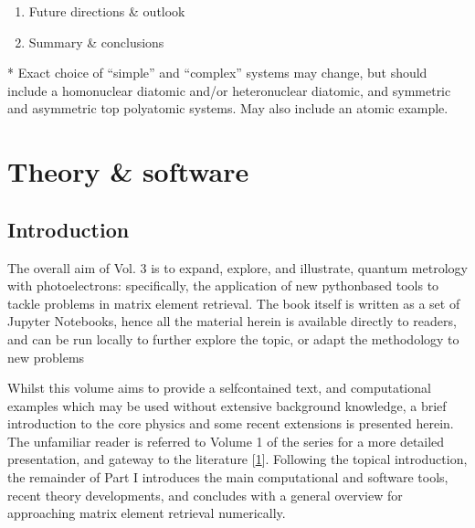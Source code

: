 \documentclass[letterpaper,10pt,english]{jupyterBook}
\begin{document}
\begin{enumerate}
\sphinxAtStartPar
c.  Direct molecular frame reconstruction via matrix\sphinxhyphen{}inversion
methods.

\sphinxAtStartPar
d.  Comparison of methods.

\sphinxAtStartPar
e.  Information content/quantum information analysis.

\item {} 
\sphinxAtStartPar
Future directions \& outlook

\item {} 
\sphinxAtStartPar
Summary \& conclusions

\end{enumerate}

\sphinxAtStartPar
* Exact choice of “simple” and “complex” systems may change, but should
include a homonuclear diatomic and/or heteronuclear diatomic, and
symmetric and asymmetric top polyatomic systems. May also include an
atomic example.

\sphinxstepscope


\part{Theory \& software}

\sphinxstepscope


\chapter{Introduction}
\label{\detokenize{part1/main_intro_051122:introduction}}\label{\detokenize{part1/main_intro_051122::doc}}
\sphinxAtStartPar
The overall aim of Vol. 3 is to expand, explore, and illustrate, quantum metrology with photoelectrons: specifically, the application of new python\sphinxhyphen{}based tools to tackle problems in matrix element retrieval. The book itself is written as a set of Jupyter Notebooks, hence all the material herein is available directly to readers, and can be run locally to further explore the topic, or adapt the methodology to new problems

\sphinxAtStartPar
Whilst this volume aims to provide a self\sphinxhyphen{}contained text, and computational examples which may be used without extensive background knowledge, a brief introduction to the core physics and some recent extensions is presented herein. The unfamiliar reader is referred to Volume 1 of the series for a more detailed presentation, and gateway to the literature {[}\hyperlink{cite.backmatter/bibliography:id52}{1}{]}. Following the topical introduction, the remainder of Part I introduces the main computational and software tools, recent theory developments, and concludes with a general overview for approaching matrix element retrieval numerically.
\end{document}
